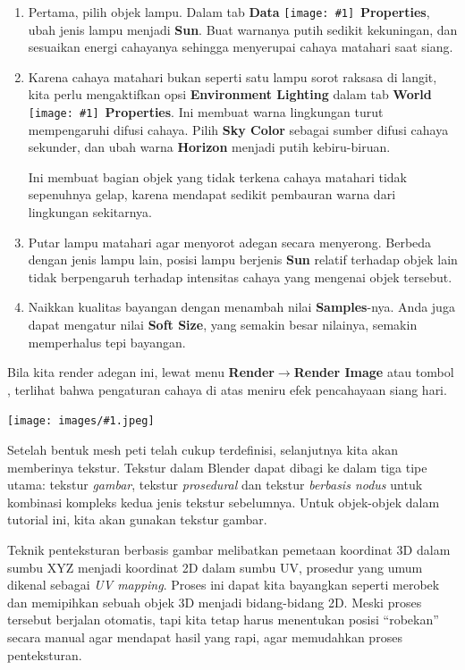 \documentclass[11pt]{report}
\newcommand{\fig}[1]{
  \begingroup
  \centering
  \texttt{[image: images/\#1.jpeg]}
  \label{fig:#1}
  \endgroup
}
\def\iconwnd#1{\texttt{[image: \#1]}}
\def\fontwnd#1{{\bfseries#1}}
\def\wndProperties{
  \iconwnd{icons/wndProperties.jpeg}~\fontwnd{Properties}}
\def\key#1{\fbox{\bfseries\ttfamily#1}}
\def\ke{$\to$}
\begin{document}
\begin{enumerate}
\item Pertama, pilih objek lampu. Dalam tab \textbf{Data} \wndProperties, ubah jenis lampu menjadi \textbf{Sun}. Buat warnanya putih sedikit kekuningan, dan sesuaikan energi cahayanya sehingga menyerupai cahaya matahari saat siang.

\item Karena cahaya matahari bukan seperti satu lampu sorot raksasa di langit, kita perlu mengaktifkan opsi \textbf{Environment Lighting} dalam tab \textbf{World} \wndProperties. Ini membuat warna lingkungan turut mempengaruhi difusi cahaya. Pilih \textbf{Sky Color} sebagai sumber difusi cahaya sekunder, dan ubah warna \textbf{Horizon} menjadi putih kebiru-biruan.

  Ini membuat bagian objek yang tidak terkena cahaya matahari tidak sepenuhnya gelap, karena mendapat sedikit pembauran warna dari lingkungan sekitarnya.

\item Putar lampu matahari agar menyorot adegan secara menyerong. Berbeda dengan jenis lampu lain, posisi lampu berjenis \textbf{Sun} relatif terhadap objek lain tidak berpengaruh terhadap intensitas cahaya yang mengenai objek tersebut.

\item Naikkan kualitas bayangan dengan menambah nilai \textbf{Samples}-nya. Anda juga dapat mengatur nilai \textbf{Soft Size}, yang semakin besar nilainya, semakin memperhalus tepi bayangan.
\end{enumerate}

Bila kita render adegan ini, lewat menu \textbf{Render}\ke\textbf{Render Image} atau tombol \key{F12}, terlihat bahwa pengaturan cahaya di atas meniru efek pencahayaan siang hari.

\fig{peti-005}

Setelah bentuk mesh peti telah cukup terdefinisi, selanjutnya kita akan memberinya tekstur. Tekstur dalam Blender dapat dibagi ke dalam tiga tipe utama: tekstur \emph{gambar}, tekstur \emph{prosedural} dan tekstur \emph{berbasis nodus} untuk kombinasi kompleks kedua jenis tekstur sebelumnya. Untuk objek-objek dalam tutorial ini, kita akan gunakan tekstur gambar.

Teknik penteksturan berbasis gambar melibatkan pemetaan koordinat 3D dalam sumbu XYZ menjadi koordinat 2D dalam sumbu UV, prosedur yang umum dikenal sebagai \emph{UV mapping}. Proses ini dapat kita bayangkan seperti merobek dan memipihkan sebuah objek 3D menjadi bidang-bidang 2D. Meski proses tersebut berjalan otomatis, tapi kita tetap harus menentukan posisi ``robekan'' secara manual agar mendapat hasil yang rapi, agar memudahkan proses penteksturan.
\end{document}
